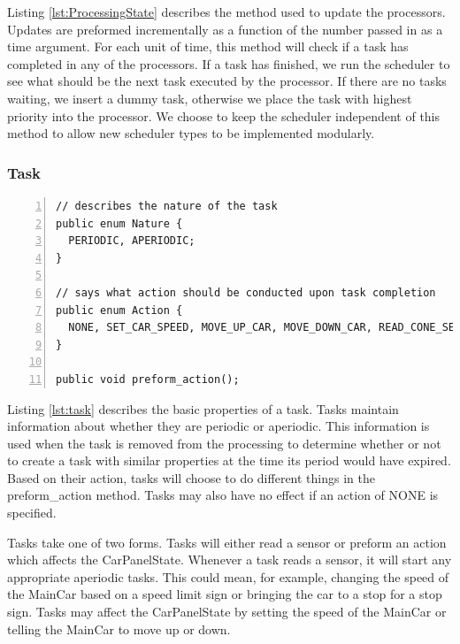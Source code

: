 \documentclass{article} %
\begin{document}
Listing \ref{lst:ProcessingState} describes the method used to update the processors.
Updates are preformed incrementally as a function of the number passed in as a time argument.
For each unit of time, this method will check if a task has completed in any of the processors.
If a task has finished, we run the scheduler to see what should be the next task executed by the processor.
If there are no tasks waiting, we insert a dummy task, otherwise we place the task with highest priority into the processor.
We choose to keep the scheduler independent of this method to allow new scheduler types to be implemented modularly.

\subsubsection{Task}
\begin{lstlisting}[caption={Tasks know how to preform their actions},label={lst:task},numbers=left]
// describes the nature of the task
public enum Nature {
  PERIODIC, APERIODIC;
}

// says what action should be conducted upon task completion
public enum Action {
  NONE, SET_CAR_SPEED, MOVE_UP_CAR, MOVE_DOWN_CAR, READ_CONE_SENSOR, READ_OTHER_CAR_SENSOR, READ_SPEED_SIGN_SENSOR, READ_STOP_SIGN_SENSOR;
}

public void preform_action();
\end{lstlisting}

Listing \ref{lst:task} describes the basic properties of a task.
Tasks maintain information about whether they are periodic or aperiodic.
This information is used when the task is removed from the processing to determine whether or not to create a task with similar properties at the time its period would have expired.
Based on their action, tasks will choose to do different things in the preform\_action method. 
Tasks may also have no effect if an action of NONE is specified.

Tasks take one of two forms.
Tasks will either read a sensor or preform an action which affects the CarPanelState.
Whenever a task reads a sensor, it will start any appropriate aperiodic tasks.
This could mean, for example, changing the speed of the MainCar based on a speed limit sign or bringing the car to a stop for a stop sign.
Tasks may affect the CarPanelState by setting the speed of the MainCar or telling the MainCar to move up or down.
\end{document}
